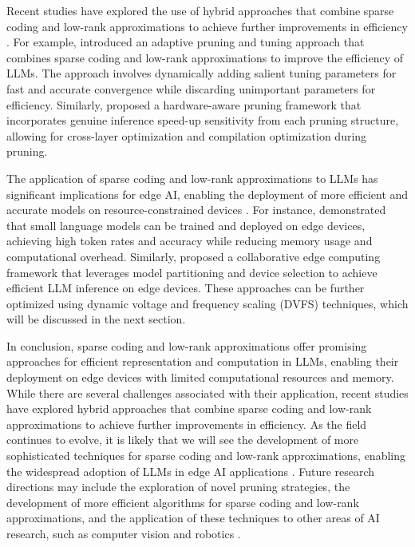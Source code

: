 \documentclass[11pt,a4paper]{article}
\begin{document}
Recent studies have explored the use of hybrid approaches that combine sparse coding and low-rank approximations to achieve further improvements in efficiency \cite{doi:10.1016/j.future.2025.108056}. For example, \cite{arxiv:2401.12200} introduced an adaptive pruning and tuning approach that combines sparse coding and low-rank approximations to improve the efficiency of LLMs. The approach involves dynamically adding salient tuning parameters for fast and accurate convergence while discarding unimportant parameters for efficiency. Similarly, \cite{doi:10.1145/3744244} proposed a hardware-aware pruning framework that incorporates genuine inference speed-up sensitivity from each pruning structure, allowing for cross-layer optimization and compilation optimization during pruning.

The application of sparse coding and low-rank approximations to LLMs has significant implications for edge AI, enabling the deployment of more efficient and accurate models on resource-constrained devices \cite{arxiv:2409.00088}. For instance, \cite{arxiv:2412.15304} demonstrated that small language models can be trained and deployed on edge devices, achieving high token rates and accuracy while reducing memory usage and computational overhead. Similarly, \cite{arxiv:2405.14371} proposed a collaborative edge computing framework that leverages model partitioning and device selection to achieve efficient LLM inference on edge devices. These approaches can be further optimized using dynamic voltage and frequency scaling (DVFS) techniques, which will be discussed in the next section.

In conclusion, sparse coding and low-rank approximations offer promising approaches for efficient representation and computation in LLMs, enabling their deployment on edge devices with limited computational resources and memory. While there are several challenges associated with their application, recent studies have explored hybrid approaches that combine sparse coding and low-rank approximations to achieve further improvements in efficiency. As the field continues to evolve, it is likely that we will see the development of more sophisticated techniques for sparse coding and low-rank approximations, enabling the widespread adoption of LLMs in edge AI applications \cite{doi:10.1109/meditcom61057.2024.10621076}. Future research directions may include the exploration of novel pruning strategies, the development of more efficient algorithms for sparse coding and low-rank approximations, and the application of these techniques to other areas of AI research, such as computer vision and robotics \cite{doi:10.1145/3676536.3676741}.
\end{document}
